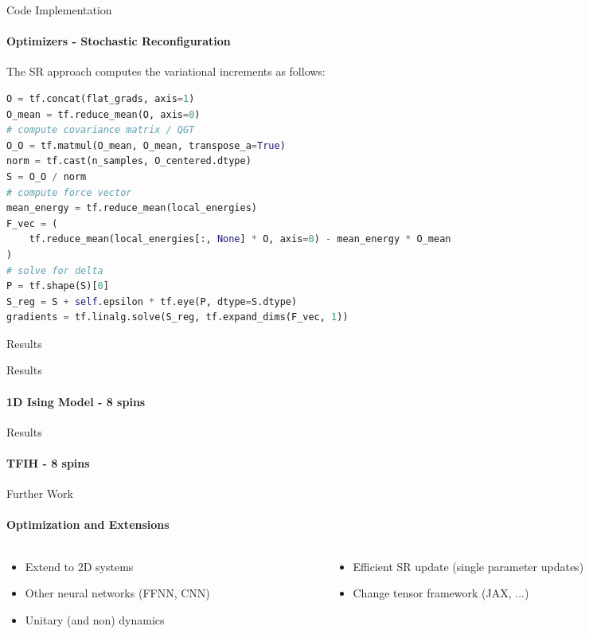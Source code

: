\documentclass{beamer}
\begin{document}
\begin{frame}[fragile]{Code Implementation}
\framesubtitle{Optimizers - Stochastic Reconfiguration}
The SR approach computes the variational increments as follows:
\begin{lstlisting}[language=Python, style=kaolstplain]
O = tf.concat(flat_grads, axis=1)
O_mean = tf.reduce_mean(O, axis=0)
# compute covariance matrix / QGT
O_O = tf.matmul(O_mean, O_mean, transpose_a=True)
norm = tf.cast(n_samples, O_centered.dtype)
S = O_O / norm
# compute force vector
mean_energy = tf.reduce_mean(local_energies)
F_vec = (
	tf.reduce_mean(local_energies[:, None] * O, axis=0) - mean_energy * O_mean
)
# solve for delta
P = tf.shape(S)[0]
S_reg = S + self.epsilon * tf.eye(P, dtype=S.dtype)
gradients = tf.linalg.solve(S_reg, tf.expand_dims(F_vec, 1))
\end{lstlisting}
\end{frame}

\begin{chapter}{}{Results}
\end{chapter}

\begin{frame}{Results}
\framesubtitle{1D Ising Model - 8 spins}
\end{frame}

\begin{frame}{Results}
\framesubtitle{TFIH - 8 spins}
\end{frame}

\begin{frame}{Further Work}
\framesubtitle{Optimization and Extensions}
\begin{columns}
\begin{column}{0.5\textwidth}
\begin{itemize}
	\item Extend to 2D systems
	\item Other neural networks (FFNN, CNN)
	\item Unitary (and non) dynamics
\end{itemize}
\end{column}
\begin{column}{0.5\textwidth}
\begin{itemize}
	\item Efficient SR update (single parameter updates)
	\item Change tensor framework (JAX, ...)
\end{itemize}
\end{column}
\end{columns}
\end{frame}
\end{document}
